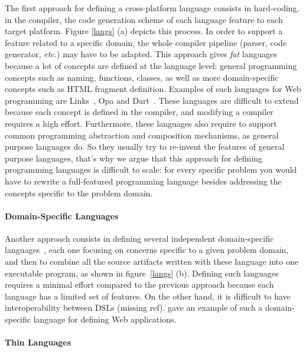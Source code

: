 \documentclass[preprint]{sigplanconf}
\newcommand{\etc}{\emph{etc.}}
\begin{document}
The first approach for defining a cross-platform language consists in hard-coding, in the compiler, the
code generation scheme of each language feature to each target platform. Figure \ref{langs} (a) depicts this
process. In order to support a feature related to a specific domain, the whole compiler pipeline (parser, code
generator, \etc) may have to be adapted. This approach gives \emph{fat} languages because a lot of concepts are
defined at the language level: general programming concepts such as naming, functions, classes, as well as more
domain-specific concepts such as HTML fragment definition. Examples of such languages for Web programming are
Links~\cite{Cooper07_Links}, Opa and Dart~\cite{Griffith11_Dart}. These languages are difficult to extend because
each concept is defined in the compiler, and modifying a compiler requires a high effort. Furthermore, these
languages also require to support common programming abstraction and composition mechanisms, as general purpose
languages do. So they usually try to re-invent the features of general purpose languages, that’s why we argue that
this approach for defining programming languages is difficult to scale: for every specific problem you would have to
rewrite a full-featured programming language besides addressing the concepts specific to the problem domain.

\paragraph{Domain-Specific Languages}

Another approach consists in defining several independent domain-specific languages~\cite{Van00_DSL}, each one
focusing on concerns specific to a given problem domain, and then to combine all the source artifacts written with
these language into one executable program, as shown in figure~\ref{langs} (b). Defining such languages requires a
minimal effort compared to the previous approach because each language has a limited set of features. On the other
hand, it is difficult to have interoperability between DSLs (missing ref). \cite{Groenewegen08_WebDSL} gave an
example of such a domain-specific language for defining Web applications.

\paragraph{Thin Languages}
\end{document}

